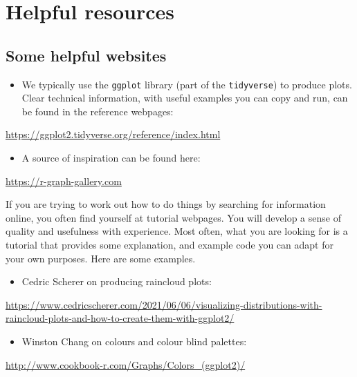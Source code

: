 \documentclass[
  letterpaper,
  DIV=11,
  numbers=noendperiod]{scrreprt}
\providecommand{\tightlist}{%
  \setlength{\itemsep}{0pt}\setlength{\parskip}{0pt}}\usepackage{longtable,booktabs,array}
\begin{document}
\hypertarget{sec-resources}{%
\section{Helpful resources}\label{sec-resources}}

\hypertarget{some-helpful-websites}{%
\subsection{Some helpful websites}\label{some-helpful-websites}}

\begin{itemize}
\tightlist
\item
  We typically use the \texttt{ggplot} library (part of the
  \texttt{tidyverse}) to produce plots. Clear technical information,
  with useful examples you can copy and run, can be found in the
  reference webpages:
\end{itemize}

\url{https://ggplot2.tidyverse.org/reference/index.html}

\begin{itemize}
\tightlist
\item
  A source of inspiration can be found here:
\end{itemize}

\url{https://r-graph-gallery.com}

If you are trying to work out how to do things by searching for
information online, you often find yourself at tutorial webpages. You
will develop a sense of quality and usefulness with experience. Most
often, what you are looking for is a tutorial that provides some
explanation, and example code you can adapt for your own purposes. Here
are some examples.

\begin{itemize}
\tightlist
\item
  Cedric Scherer on producing raincloud plots:
\end{itemize}

\url{https://www.cedricscherer.com/2021/06/06/visualizing-distributions-with-raincloud-plots-and-how-to-create-them-with-ggplot2/}

\begin{itemize}
\tightlist
\item
  Winston Chang on colours and colour blind palettes:
\end{itemize}

\url{http://www.cookbook-r.com/Graphs/Colors_(ggplot2)/}
\end{document}
